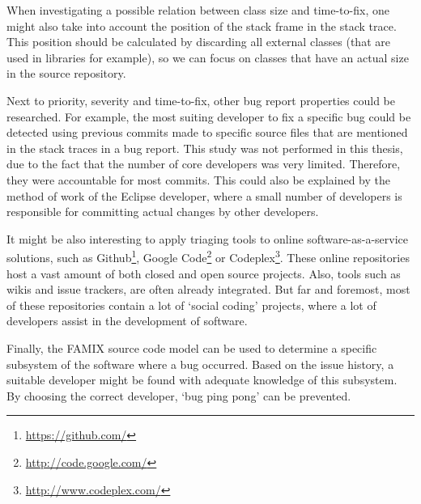 When investigating a possible relation between class size and time-to-fix, one might also take into account the position of the stack frame in the stack trace. This position should be calculated by discarding all external classes (that are used in libraries for example), so we can focus on classes that have an actual size in the source repository.

Next to priority, severity and time-to-fix, other bug report properties could be researched. For example, the most suiting developer to fix a specific bug could be detected using previous commits made to specific source files that are mentioned in the stack traces in a bug report. This study was not performed in this thesis, due to the fact that the number of core developers was very limited. Therefore, they were accountable for most commits. This could also be explained by the method of work of the Eclipse developer, where a small number of developers is responsible for committing actual changes by other developers.

It might be also interesting to apply triaging tools to online software-as-a-service solutions, such as Github\footnote{\url{https://github.com/}}, Google Code\footnote{\url{http://code.google.com/}} or Codeplex\footnote{\url{http://www.codeplex.com/}}. These online repositories host a vast amount of both closed and open source projects. Also, tools such as wikis and issue trackers, are often already integrated. But far and foremost, most of these repositories contain a lot of `social coding' projects, where a lot of developers assist in the development of software.

Finally, the FAMIX source code model can be used to determine a specific subsystem of the software where a bug occurred. Based on the issue history, a suitable developer might be found with adequate knowledge of this subsystem. By choosing the correct developer, `bug ping pong' can be prevented.


